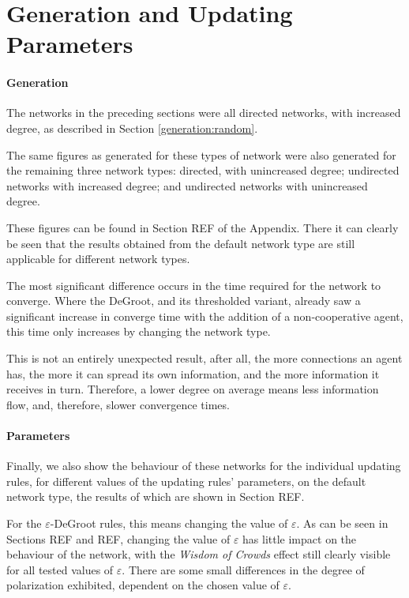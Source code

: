 \documentclass[a4paper, 12pt]{report}
\begin{document}
\newpage

\section{Generation and Updating Parameters}

\paragraph{Generation} The networks in the preceding sections were all directed networks, with increased degree, as described in Section \ref{generation:random}.

The same figures as generated for these types of network were also generated for the remaining three network types: directed, with unincreased degree; undirected networks with increased degree; and undirected networks with unincreased degree.

These figures can be found in Section REF of the Appendix. There it can clearly be seen that the results obtained from the default network type are still applicable for different network types.

The most significant difference occurs in the time required for the network to converge. Where the DeGroot, and its thresholded variant, already saw a significant increase in converge time with the addition of a non-cooperative agent, this time only increases by changing the network type. 

This is not an entirely unexpected result, after all, the more connections an agent has, the more it can spread its own information, and the more information it receives in turn. Therefore, a lower degree on average means less information flow, and, therefore, slower convergence times.
\paragraph{Parameters} Finally, we also show the behaviour of these networks for the individual updating rules, for different values of the updating rules' parameters, on the default network type, the results of which are shown in Section REF.

For the $\varepsilon$-DeGroot rules, this means changing the value of $\varepsilon$. As can be seen in Sections REF and REF, changing the value of $\varepsilon$ has little impact on the behaviour of the network, with the \emph{Wisdom of Crowds} effect still clearly visible for all tested values of $\varepsilon$. There are some small differences in the degree of polarization exhibited, dependent on the chosen value of $\varepsilon$.
\end{document}
